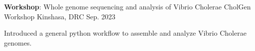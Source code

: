 
  \cventry
    {\textbf{Workshop}: Whole genome sequencing and analysis of Vibrio Cholerae} %
    {CholGen Workshop} %
    {Kinshasa, DRC} %
    {Sep. 2023} %
    {
      \begin{cvitems} %
        \item {Introduced a general python workflow to assemble and analyze Vibrio Cholerae genomes.}
      \end{cvitems}
    }


